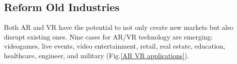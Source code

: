 \documentclass[preprint,12pt]{elsarticle}
\begin{document}


\subsection{Reform Old Industries}
Both AR and VR have the potential to not only create new markets but also disrupt existing ones. Nine cases for AR/VR technology are emerging: videogames, live events, video entertainment, retail, real estate, education, healthcare, engineer, and military (Fig.\ref{AR VR applications}).
\end{document}
